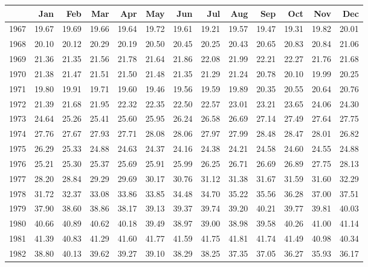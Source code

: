 \begin{longtable}{rrrrrrrrrrrrr}
  \hline
 & Jan & Feb & Mar & Apr & May & Jun & Jul & Aug & Sep & Oct & Nov & Dec \\ 
  \hline
1967 & 19.67 & 19.69 & 19.66 & 19.64 & 19.72 & 19.61 & 19.21 & 19.57 & 19.47 & 19.31 & 19.82 & 20.01 \\ 
  1968 & 20.10 & 20.12 & 20.29 & 20.19 & 20.50 & 20.45 & 20.25 & 20.43 & 20.65 & 20.83 & 20.84 & 21.06 \\ 
  1969 & 21.36 & 21.35 & 21.56 & 21.78 & 21.64 & 21.86 & 22.08 & 21.99 & 22.21 & 22.27 & 21.76 & 21.68 \\ 
  1970 & 21.38 & 21.47 & 21.51 & 21.50 & 21.48 & 21.35 & 21.29 & 21.24 & 20.78 & 20.10 & 19.99 & 20.25 \\ 
  1971 & 19.80 & 19.91 & 19.71 & 19.60 & 19.46 & 19.56 & 19.59 & 19.89 & 20.35 & 20.55 & 20.64 & 20.76 \\ 
  1972 & 21.39 & 21.68 & 21.95 & 22.32 & 22.35 & 22.50 & 22.57 & 23.01 & 23.21 & 23.65 & 24.06 & 24.30 \\ 
  1973 & 24.64 & 25.26 & 25.41 & 25.60 & 25.95 & 26.24 & 26.58 & 26.69 & 27.14 & 27.49 & 27.64 & 27.75 \\ 
  1974 & 27.76 & 27.67 & 27.93 & 27.71 & 28.08 & 28.06 & 27.97 & 27.99 & 28.48 & 28.47 & 28.01 & 26.82 \\ 
  1975 & 26.29 & 25.33 & 24.88 & 24.63 & 24.37 & 24.16 & 24.38 & 24.21 & 24.58 & 24.60 & 24.55 & 24.88 \\ 
  1976 & 25.21 & 25.30 & 25.37 & 25.69 & 25.91 & 25.99 & 26.25 & 26.71 & 26.69 & 26.89 & 27.75 & 28.13 \\ 
  1977 & 28.20 & 28.84 & 29.29 & 29.69 & 30.17 & 30.76 & 31.12 & 31.38 & 31.67 & 31.59 & 31.60 & 32.29 \\ 
  1978 & 31.72 & 32.37 & 33.08 & 33.86 & 33.85 & 34.48 & 34.70 & 35.22 & 35.56 & 36.28 & 37.00 & 37.51 \\ 
  1979 & 37.90 & 38.60 & 38.86 & 38.17 & 39.13 & 39.37 & 39.74 & 39.20 & 40.21 & 39.77 & 39.81 & 40.03 \\ 
  1980 & 40.66 & 40.89 & 40.62 & 40.18 & 39.49 & 38.97 & 39.00 & 38.98 & 39.58 & 40.26 & 41.00 & 41.14 \\ 
  1981 & 41.39 & 40.83 & 41.29 & 41.60 & 41.77 & 41.59 & 41.75 & 41.81 & 41.74 & 41.49 & 40.98 & 40.34 \\ 
  1982 & 38.80 & 40.13 & 39.62 & 39.27 & 39.10 & 38.29 & 38.25 & 37.35 & 37.05 & 36.27 & 35.93 & 36.17 \\ 

\end{longtable}
